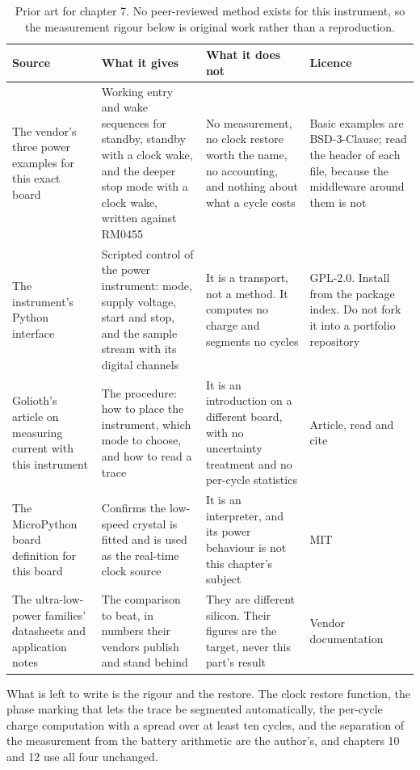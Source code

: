 \begin{table}[H]\centering\small
\begin{tabular}{p{32mm}p{46mm}p{40mm}p{20mm}}
\toprule
Source & What it gives & What it does not & Licence \\
\midrule
The vendor's three power examples for this exact board & Working entry and wake sequences for standby, standby with a clock wake, and the deeper stop mode with a clock wake, written against RM0455 & No measurement, no clock restore worth the name, no accounting, and nothing about what a cycle costs & Basic examples are BSD-3-Clause; read the header of each file, because the middleware around them is not \\
The instrument's Python interface & Scripted control of the power instrument: mode, supply voltage, start and stop, and the sample stream with its digital channels & It is a transport, not a method. It computes no charge and segments no cycles & GPL-2.0. Install from the package index. Do not fork it into a portfolio repository \\
Golioth's article on measuring current with this instrument & The procedure: how to place the instrument, which mode to choose, and how to read a trace & It is an introduction on a different board, with no uncertainty treatment and no per-cycle statistics & Article, read and cite \\
The MicroPython board definition for this board & Confirms the low-speed crystal is fitted and is used as the real-time clock source & It is an interpreter, and its power behaviour is not this chapter's subject & MIT \\
The ultra-low-power families' datasheets and application notes & The comparison to beat, in numbers their vendors publish and stand behind & They are different silicon. Their figures are the target, never this part's result & Vendor documentation \\
\bottomrule
\end{tabular}
\caption{Prior art for chapter 7. No peer-reviewed method exists for this instrument, so the measurement rigour below is original work rather than a reproduction.}
\end{table}

What is left to write is the rigour and the restore. The clock restore
function, the phase marking that lets the trace be segmented automatically, the
per-cycle charge computation with a spread over at least ten cycles, and the
separation of the measurement from the battery arithmetic are the author's, and
chapters 10 and 12 use all four unchanged.

